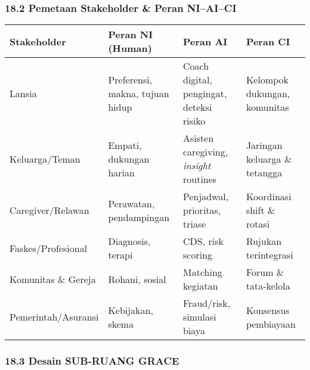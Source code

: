 \documentclass[
  letterpaper,
  DIV=11,
  numbers=noendperiod]{scrartcl}
\begin{document}
\subsubsection{18.2 Pemetaan Stakeholder \& Peran
NI--AI--CI}\label{pemetaan-stakeholder-peran-niaici}

\begin{longtable}[]{@{}
  >{\raggedright\arraybackslash}p{}
  >{\raggedright\arraybackslash}p{}
  >{\raggedright\arraybackslash}p{}
  >{\raggedright\arraybackslash}p{}@{}}
\toprule\noalign{}
\begin{minipage}[b]{\linewidth}\raggedright
Stakeholder
\end{minipage} & \begin{minipage}[b]{\linewidth}\raggedright
Peran NI (Human)
\end{minipage} & \begin{minipage}[b]{\linewidth}\raggedright
Peran AI
\end{minipage} & \begin{minipage}[b]{\linewidth}\raggedright
Peran CI
\end{minipage} \\
\midrule\noalign{}
\endhead
\bottomrule\noalign{}
\endlastfoot
Lansia & Preferensi, makna, tujuan hidup & Coach digital, pengingat,
deteksi risiko & Kelompok dukungan, komunitas \\
Keluarga/Teman & Empati, dukungan harian & Asisten caregiving,
\emph{insight} routines & Jaringan keluarga \& tetangga \\
Caregiver/Relawan & Perawatan, pendampingan & Penjadwal, prioritas,
triase & Koordinasi shift \& rotasi \\
Faskes/Profesional & Diagnosis, terapi & CDS, risk scoring & Rujukan
terintegrasi \\
Komunitas \& Gereja & Rohani, sosial & Matching kegiatan & Forum \&
tata‑kelola \\
Pemerintah/Asuransi & Kebijakan, skema & Fraud/risk, simulasi biaya &
Konsensus pembiayaan \\
\end{longtable}

\subsubsection{18.3 Desain SUB‑RUANG GRACE}\label{desain-subruang-grace}
\end{document}
